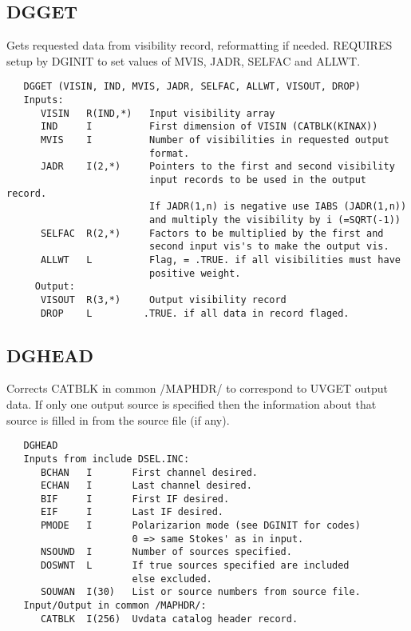 \subsection{DGGET}
Gets requested data from visibility record, reformatting if needed.
REQUIRES setup by DGINIT to set values of MVIS, JADR, SELFAC and
ALLWT.
\begin{verbatim}
   DGGET (VISIN, IND, MVIS, JADR, SELFAC, ALLWT, VISOUT, DROP)
   Inputs:
      VISIN   R(IND,*)   Input visibility array
      IND     I          First dimension of VISIN (CATBLK(KINAX))
      MVIS    I          Number of visibilities in requested output
                         format.
      JADR    I(2,*)     Pointers to the first and second visibility
                         input records to be used in the output record.
                         If JADR(1,n) is negative use IABS (JADR(1,n))
                         and multiply the visibility by i (=SQRT(-1))
      SELFAC  R(2,*)     Factors to be multiplied by the first and
                         second input vis's to make the output vis.
      ALLWT   L          Flag, = .TRUE. if all visibilities must have
                         positive weight.
     Output:
      VISOUT  R(3,*)     Output visibility record
      DROP    L         .TRUE. if all data in record flaged.
\end{verbatim}

\subsection{DGHEAD }
Corrects CATBLK in common /MAPHDR/ to correspond to UVGET output data.
If only one output source is specified then the information about that
source is filled in from the source file (if any).

\begin{verbatim}
   DGHEAD
   Inputs from include DSEL.INC:
      BCHAN   I       First channel desired.
      ECHAN   I       Last channel desired.
      BIF     I       First IF desired.
      EIF     I       Last IF desired.
      PMODE   I       Polarizarion mode (see DGINIT for codes)
                      0 => same Stokes' as in input.
      NSOUWD  I       Number of sources specified.
      DOSWNT  L       If true sources specified are included
                      else excluded.
      SOUWAN  I(30)   List or source numbers from source file.
   Input/Output in common /MAPHDR/:
      CATBLK  I(256)  Uvdata catalog header record.

\end{verbatim}

